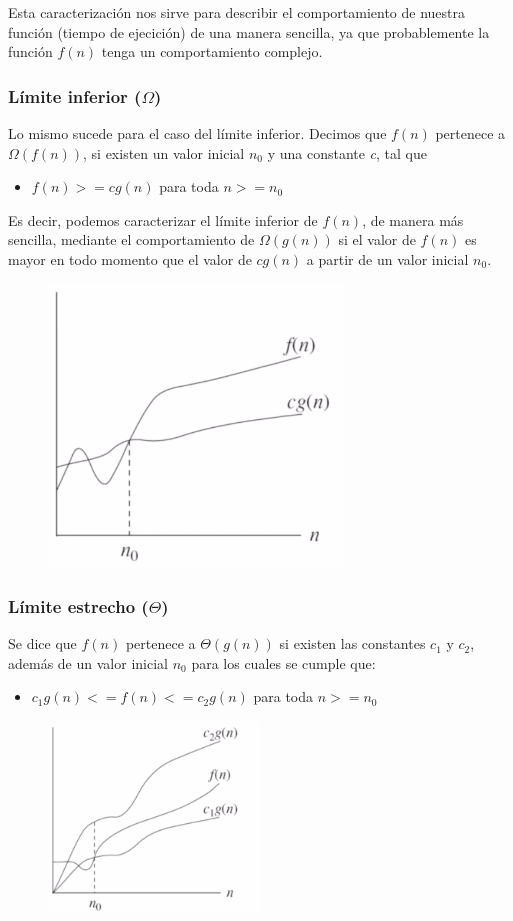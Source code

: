 \documentclass[letterpaper, 12pt]{article}
\begin{document}
Esta caracterización nos sirve para describir el comportamiento de nuestra
función (tiempo de ejecición) de una manera sencilla, ya que probablemente la
función \(f(n)\) tenga un comportamiento complejo.
\subsubsection{Límite inferior (\(\Omega\))}
\label{sec:org99b0851}
Lo mismo sucede para el caso del límite inferior. Decimos que \(f(n)\) pertenece a
\(\Omega(f(n))\), si existen un valor inicial \(n_0\) y una constante \emph{c}, tal que
\begin{itemize}
\item \(f(n) >= c g(n)\) para toda \(n >= n_0\)
\end{itemize}
Es decir, podemos caracterizar el límite inferior de \(f(n)\), de manera más
sencilla, mediante el comportamiento de \(\Omega(g(n))\) si el valor de \(f(n)\) es
mayor en todo momento que el valor de \(c g(n)\) a partir de un valor inicial
\(n_0\).

\begin{figure}
    \includegraphics[width=0.7\textwidth, height=0.4\textwidth]
        {./img/limite_inferior.png}
\end{figure}
\subsubsection{Límite estrecho (\(\Theta\))}
\label{sec:orgc6ce78c}
Se dice que \(f(n)\) pertenece a \(\Theta(g(n))\) si existen las constantes \(c_1\) y
\(c_2\), además de un valor inicial \(n_0\) para los cuales se cumple que:
\begin{itemize}
\item \(c_1 g(n) <= f(n) <= c_2 g(n)\) para toda \(n >= n_0\)
\end{itemize}

\begin{figure}
    \includegraphics[width=0.5\textwidth, keepaspectratio]
        {./img/limite_estrecho.png}
\end{figure}
\end{document}
